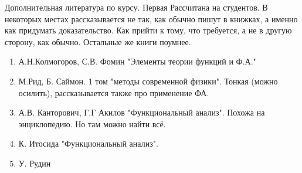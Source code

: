 \documentclass[document]{subfiles}
\begin{document}
Дополнительная литература по курсу. Первая Рассчитана на студентов. В некоторых местах рассказывается не так, как обычно пишут в книжках, а именно как придумать доказательство.
 Как прийти к тому, что требуется, а не в другую сторону, как обычно. Остальные же книги поумнее.
\
\begin{enumerate}
    \item А.Н.Колмогоров, С.В. Фомин "Элементы теории функций и Ф.А."
    \item М.Рид, Б. Саймон. 1 том "методы современной физики". Тонкая (можно осилить), рассказывается также про применение ФА.
    \item А.В. Канторович, Г.Г Акилов "Функциональный анализ". Похожа на энциклопедию. Но там можно найти всё.
    \item К. Итосида "Функциональный анализ".
    \item У. Рудин
\end{enumerate}
\end{document}
